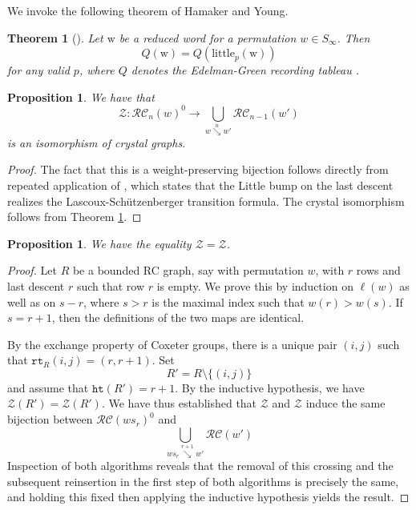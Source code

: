 \documentclass{amsart}
\newtheorem{proposition}[lemma]{Proposition}
\newtheorem{theorem}{Theorem}[section]
\theoremstyle{definition}
\theoremstyle{remark}
\numberwithin{equation}{subsection}
\DeclareMathOperator{\sch}{\mathfrak{S}}
\newcommand{\downvar}[1]{\stackrel{#1}{\searrow}}
\newcommand{\rtt}{\mathtt{rt}}
\newcommand{\zeromap}{\mathcal{Z}}
\newcommand{\hr}{\mathtt{ht}}
\newcommand{\RC}{\mathcal{RC}}
\newcommand{\lzeromap}{\mathscr{Z}}
\newcommand{\ltb}{\mathrm{little}}
\begin{document}
We invoke the following theorem of Hamaker and Young.

\begin{theorem}[{\cite[Theorem~4.4]{hamaker2014relating}}] \label{theorem:littlecrystal}
Let $\mathrm{w}$ be a reduced word for a permutation $w\in S_\infty$. Then
$$Q(\mathrm{w}) = Q(\ltb_p(\mathrm{w}))$$
for any valid $p$, where $Q$ denotes the Edelman-Green recording tableau \cite{edelman1987balanced}.
\end{theorem}


\begin{proposition} \label{proposition:zeroequal}
  We have that
$$\lzeromap:\RC_n(w)^0\to \bigcup_{w\downvar{n} w'}\RC_{n-1}(w')$$ 
	is an isomorphism of crystal graphs.
\end{proposition}
\begin{proof}
The fact that this is a weight-preserving bijection follows directly from repeated application of \cite[Lemma~7]{little2003combinatorial}, which states that the Little bump on the last descent realizes the Lascoux-Sch\"utzenberger transition formula. The crystal isomorphism follows from Theorem \ref{theorem:littlecrystal}.
\end{proof}

\begin{proposition} \label{proposition:zerocrystal}
We have the equality $\lzeromap=\zeromap$.
\end{proposition}
\begin{proof}
Let $R$ be a bounded RC graph, say with permutation $w$, with $r$ rows and last descent $r$ such that row $r$ is empty. We prove this by induction on $\ell(w)$ as well as on $s - r$, where $s>r$ is the maximal index such that $w(r)>w(s)$. If $s=r+1$, then the definitions of the two maps are identical. 

By the exchange property of Coxeter groups, there is a unique pair $(i,j)$ such that $\rtt_R(i, j) = (r, r+1)$. Set
$$R' = R\setminus\{(i,j)\}$$
and assume that $\hr(R') = r+1$. By the inductive hypothesis, we have $\lzeromap(R') = \zeromap(R')$. We have thus established that $\lzeromap$ and $\zeromap$ induce the same bijection between $\RC(ws_r)^0$ and 
$$\bigcup_{ws_r\downvar{r+1} w'}\RC(w')$$
Inspection of both algorithms reveals that the removal of this crossing and the subsequent reinsertion in the first step of both algorithms is precisely the same, and holding this fixed then applying the inductive hypothesis yields the result.
\end{proof}
\end{document}
